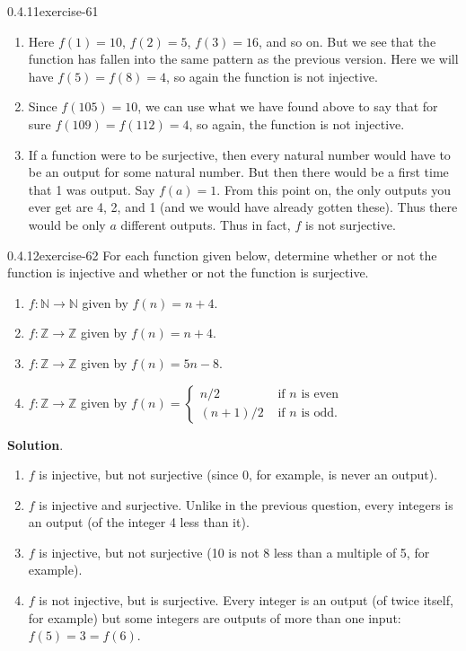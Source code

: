 \documentclass[twoside,11pt,]{book}
\numberwithin{equation}{chapter}
\newcommand{\N}{\mathbb N}
\newcommand{\Z}{\mathbb Z}
\newcommand{\amp}{&}
\begin{document}
\begin{divisionsolution}{0.4.11}{}{exercise-61}
\begin{enumerate}[label=(\alph*)]
\item\hypertarget{li-856}{}\hypertarget{p-1065}{}%
Here \(f(1) = 10\), \(f(2) = 5\), \(f(3) = 16\), and so on. But we see that the function has fallen into the same pattern as the previous version. Here we will have \(f(5) = f(8) = 4\), so again the function is not injective.%
\item\hypertarget{li-857}{}\hypertarget{p-1066}{}%
Since \(f(105) = 10\), we can use what we have found above to say that for sure \(f(109) = f(112) = 4\), so again, the function is not injective.%
\item\hypertarget{li-858}{}\hypertarget{p-1067}{}%
If a function were to be surjective, then every natural number would have to be an output for some natural number. But then there would be a first time that 1 was output. Say \(f(a) = 1\). From this point on, the only outputs you ever get are 4, 2, and 1 (and we would have already gotten these). Thus there would be only \(a\) different outputs. Thus in fact, \(f\) is not surjective.%
\end{enumerate}
%
\end{divisionsolution}%
\begin{divisionsolution}{0.4.12}{}{exercise-62}%
\hypertarget{p-1068}{}%
For each function given below, determine whether or not the function is injective and whether or not the function is surjective.\leavevmode%
\begin{enumerate}[label=(\alph*)]
\item\hypertarget{li-859}{}\(f:\N \to \N\) given by \(f(n) = n+4\).%
\item\hypertarget{li-860}{}\(f:\Z \to \Z\) given by \(f(n) = n+4\).%
\item\hypertarget{li-861}{}\(f:\Z \to \Z\) given by \(f(n) = 5n - 8\).%
\item\hypertarget{li-862}{}\(f:\Z \to \Z\) given by \(f(n) = \begin{cases}n/2 \amp \text{ if } n \text{ is even} \\ (n+1)/2 \amp \text{ if } n \text{ is odd} . \end{cases}\)%
\end{enumerate}
%
\par\smallskip%
\noindent\textbf{Solution}.\quad%
\hypertarget{p-1069}{}%
\leavevmode%
\begin{enumerate}[label=(\alph*)]
\item\hypertarget{li-863}{}\(f\) is injective, but not surjective (since 0, for example, is never an output).%
\item\hypertarget{li-864}{}\(f\) is injective and surjective. Unlike in the previous question, every integers is an output (of the integer 4 less than it).%
\item\hypertarget{li-865}{}\(f\) is injective, but not surjective (10 is not 8 less than a multiple of 5, for example).%
\item\hypertarget{li-866}{}\(f\) is not injective, but is surjective. Every integer is an output (of twice itself, for example) but some integers are outputs of more than one input: \(f(5) = 3 = f(6)\).%
\end{enumerate}
%
\end{divisionsolution}%
\end{document}
